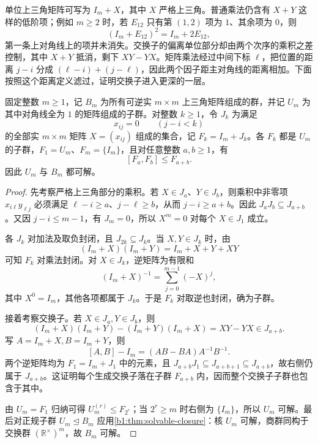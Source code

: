\ProseParagraphBreak
单位上三角矩阵可写为 \(I_m+X\)，其中 \(X\) 严格上三角。普通乘法仍含有 \(X+Y\) 这样的低阶项；例如 \(m\ge2\) 时，若 \(E_{12}\) 只有第 \((1,2)\) 项为 \(1\)、其余项为 \(0\)，则
\[
	(I_m+E_{12})^2=I_m+2E_{12},
\]
第一条上对角线上的项并未消失。交换子的偏离单位部分却由两个次序的乘积之差控制，其中 \(X+Y\) 抵消，剩下 \(XY-YX\)。矩阵乘法经过中间下标 \(\ell\)，把位置的距离 \(j-i\) 分成 \((\ell-i)+(j-\ell)\)，因此两个因子距主对角线的距离相加。下面按照这个距离定义滤过，证明交换子进入更深的一层。

\begin{proposition}[单位上三角群的交换子滤过]\label{b1:prop:unitriangular-filtration}
	固定整数 \(m\ge1\)，记 \(B_m\) 为所有可逆实 \(m\times m\) 上三角矩阵组成的群，并记 \(U_m\) 为其中对角线全为 \(1\) 的矩阵组成的子群。对整数 \(k\ge1\)，令 \(J_k\) 为满足
	\[
		x_{ij}=0\qquad(j-i<k)
	\]
	的全部实 \(m\times m\) 矩阵 \(X=(x_{ij})\) 组成的集合，记 \(F_k=I_m+J_k\)。各 \(F_k\) 都是 \(U_m\) 的子群，\(F_1=U_m\)、\(F_m=\{I_m\}\)，且对任意整数 \(a,b\ge1\)，有
	\[
		[F_a,F_b]\le F_{a+b}.
	\]
	因此 \(U_m\) 与 \(B_m\) 都可解。
\end{proposition}
\begin{proof}
	先考察严格上三角部分的乘积。若 \(X\in J_a\)、\(Y\in J_b\)，则乘积中非零项 \(x_{i\ell}y_{\ell j}\) 必须满足 \(\ell-i\ge a\)、\(j-\ell\ge b\)，从而 \(j-i\ge a+b\)。因此 \(J_aJ_b\subseteq J_{a+b}\)。又因 \(j-i\le m-1\)，有 \(J_m=0\)，所以 \(X^m=0\) 对每个 \(X\in J_1\) 成立。

	各 \(J_k\) 对加法及取负封闭，且 \(J_{2k}\subseteq J_k\)。当 \(X,Y\in J_k\) 时，由
	\[
		(I_m+X)(I_m+Y)=I_m+X+Y+XY
	\]
	可知 \(F_k\) 对乘法封闭。对 \(X\in J_k\)，逆矩阵为有限和
	\[
		(I_m+X)^{-1}=\sum_{j=0}^{m-1}(-X)^j,
	\]
	其中 \(X^0=I_m\)，其他各项都属于 \(J_k\)。于是 \(F_k\) 对取逆也封闭，确为子群。

	接着考察交换子。若 \(X\in J_a,Y\in J_b\)，则
	\[
		(I_m+X)(I_m+Y)-(I_m+Y)(I_m+X)=XY-YX\in J_{a+b}.
	\]
	写 \(A=I_m+X,B=I_m+Y\)，则
	\[
		[A,B]-I_m=(AB-BA)A^{-1}B^{-1}.
	\]
	两个逆矩阵均为 \(F_1=I_m+J_1\) 中的元素，且 \(J_{a+b}J_1\subseteq J_{a+b+1}\subseteq J_{a+b}\)，故右侧仍属于 \(J_{a+b}\)。这证明每个生成交换子落在子群 \(F_{a+b}\) 内，因而整个交换子子群也包含于其中。

	由 \(U_m=F_1\) 归纳可得 \(U_m^{(r)}\le F_{2^r}\)；当 \(2^r\ge m\) 时右侧为 \(\{I_m\}\)，所以 \(U_m\) 可解。最后对正规子群 \(U_m\trianglelefteq B_m\) 应用\cref{b1:thm:solvable-closure}：核 \(U_m\) 可解，商群同构于交换群 \((\mathbb R^\times)^m\)，故 \(B_m\) 可解。
\end{proof}

